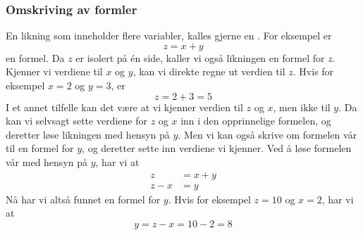 \subsubsection{Omskriving av formler}
En likning som inneholder flere variabler, kalles gjerne en .
For eksempel er
\[ z = x+y \]
en formel. Da $z$ er isolert på én side, kaller vi også likningen en formel for $z$. Kjenner vi verdiene til $x$ og $y$, kan vi direkte regne ut verdien til $z$. Hvis for eksempel $x=2$ og $y=3$, er
\[ z=2+3=5 \]
I et annet tilfelle kan det være at vi kjenner verdien til $z$ og $x$, men ikke til $y$. Da kan vi selvsagt sette verdiene for $z$ og $x$ inn i den opprinnelige formelen, og deretter løse likningen med hensyn på $y$. Men vi kan også skrive om formelen vår til en formel for $y$, og deretter sette inn verdiene vi kjenner. Ved å løse formelen vår med hensyn på $y$, har vi at \vs
\begin{align*}
	z&=x+y \\
	z-x&=y
\end{align*}
Nå har vi altså funnet en formel for $y$. Hvis for eksempel $z=10$ og $x=2$, har vi at
\[ y=z-x=10-2=8 \]
\newpage

